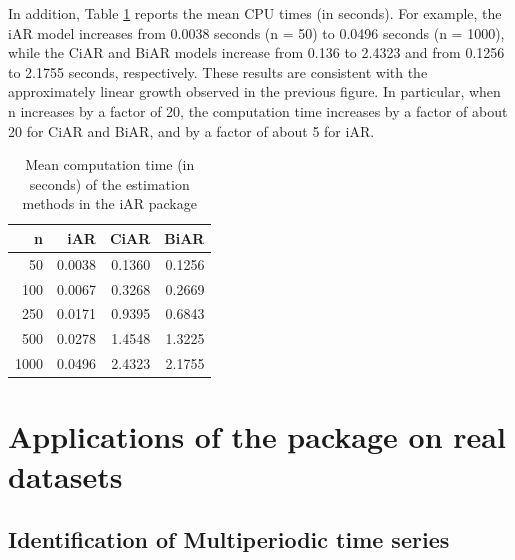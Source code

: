 In addition, Table \ref{tab:timestable} reports the mean CPU times (in seconds). For example, the iAR model increases from
0.0038 seconds (n = 50) to 0.0496 seconds (n = 1000), while the CiAR and BiAR models increase from 0.136 to 2.4323 and from 0.1256 to 2.1755 seconds, respectively. These results are consistent with the approximately linear growth observed in the previous figure. In particular, when n increases by a factor of 20, the computation time increases by a factor of about 20 for CiAR and BiAR, and by a factor of about 5 for iAR.

\begin{table}

\caption{\label{tab:timestable}Mean computation time (in seconds) of the estimation methods in the iAR package}
\centering
\begin{tabular}[t]{r|r|r|r}
\hline
n & iAR & CiAR & BiAR\\
\hline
50 & 0.0038 & 0.1360 & 0.1256\\
\hline
100 & 0.0067 & 0.3268 & 0.2669\\
\hline
250 & 0.0171 & 0.9395 & 0.6843\\
\hline
500 & 0.0278 & 1.4548 & 1.3225\\
\hline
1000 & 0.0496 & 2.4323 & 2.1755\\
\hline
\end{tabular}
\end{table}

\section{\texorpdfstring{Applications of the  package on real datasets}{Applications of the  package on real datasets}}\label{sec:applications}

\subsection{Identification of Multiperiodic time series}\label{identification-of-multiperiodic-time-series}

